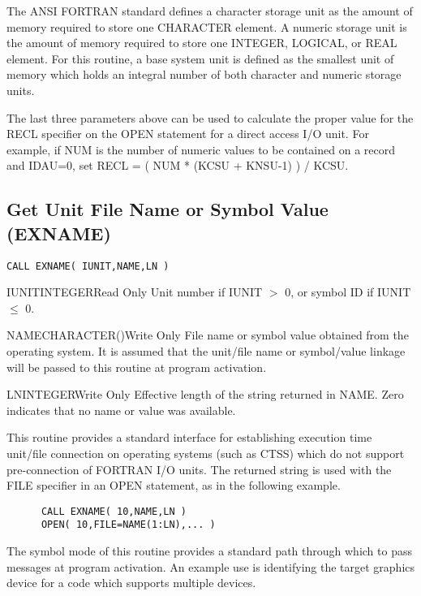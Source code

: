 The ANSI FORTRAN standard defines a character storage unit as the amount of
memory required to store one CHARACTER element.  A numeric storage unit is
the amount of memory required to store one INTEGER, LOGICAL, or REAL
element.  For this routine, a base system unit is defined as the smallest
unit of memory which holds an integral number of both character and numeric
storage units.

The last three parameters above can be used to calculate the proper value
for the RECL specifier on the OPEN statement for a direct access I/O unit.
For example, if NUM is the number of numeric values to be contained on a
record and IDAU=0, set RECL = ( NUM * (KCSU + KNSU-1) ) / KCSU.


\subsection{Get Unit File Name or Symbol Value (EXNAME)}

\verb+CALL EXNAME( IUNIT,NAME,LN )+

\begin{argy}{IUNIT}{INTEGER}{Read Only}
Unit number if IUNIT $>$ 0, or symbol ID if IUNIT $\leq$ 0.
\end{argy}

\begin{argy}{NAME}{CHARACTER\last(\last)}{Write Only}
File name or symbol value obtained from the operating system. It is assumed
that the unit/file name or symbol/value linkage will be passed to this
routine at program activation. 
\end{argy}

\begin{argy}{LN}{INTEGER}{Write Only}
Effective length of the string returned in NAME.  Zero indicates that no
name or value was available. 
\end{argy}

This routine provides a standard interface for establishing execution time
unit/file connection on operating systems (such as CTSS) which do not
support pre-connection of FORTRAN I/O units.  The returned string is used
with the FILE specifier in an OPEN statement, as in the following example.
\begin{verbatim}
      CALL EXNAME( 10,NAME,LN )
      OPEN( 10,FILE=NAME(1:LN),... )
\end{verbatim}
The symbol mode of this routine provides a standard path through which to
pass messages at program activation.  An example use is identifying the
target graphics device for a code which supports multiple devices.

